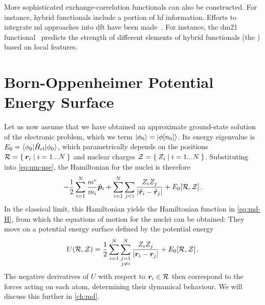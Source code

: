 More sophisticated exchange-correlation functionals can also be constructed. For instance, hybrid functionals include a portion of \gls{hf} information. Efforts to integrate \gls{ml} approaches into \gls{dft} have been made~\cite{srmb2012q,khbg2022q}.
 For instance, the \gls{dm21} functional~\cite{kmhc2021q} predicts the strength of different elements of hybrid functionals (the ) based on local features.


\section{Born-Oppenheimer Potential Energy Surface}
\label{sec:qm-bo}

Let us now assume that we have obtained an approximate ground-state solution of the electronic problem, which we term $\ket{\phi_0} = \ket{\phi[n_0]}$. Its energy eigenvalue is $E_0 = \braket{\phi_0|\hat H_{\text{el}}|\phi_0}$, which parametrically depends on the positions $\mathcal{R} = \Set{\boldsymbol{r}_i | i=1...N}$ and nuclear charges $\mathcal{Z} = \Set{Z_i | i=1...N}$. 
Substituting into \cref{eq:qm-nse}, the Hamiltonian for the nuclei is therefore
\begin{equation}
	- \frac{1}{2} \sum_{i=1}^N \frac{\mel}{m_i} \opp_i
	+ \sum_{i=1}^N \sum_{j<i} \frac{Z_i Z_j}{\magnitude{\opr_i - \opr_j}} 
	+ E_0[\Rgen,\Charges] \, . \label{eq:qm-qbopes}
\end{equation}
In the classical limit, this Hamiltonian yields the Hamiltonian function in \cref{eq:md-H}, from which the equations of motion for the nuclei can be obtained: They move on a potential energy surface defined by the potential energy
\begin{equation}
	U(\mathcal{R}, \mathcal{Z}) = \frac{1}{2} \sum_{i=1}^N \sum_{\substack{j=1 \\ j \neq i}}^N \frac{Z_i Z_j}{|\boldsymbol{r}_i - \boldsymbol{r}_j|} + E_0[\mathcal{R},\mathcal{Z}] \, .
\end{equation}
The negative derivatives of $U$ with respect to $\boldsymbol{r}_i \in \mathcal{R}$ then correspond to the forces acting on each atom, determining their dynamical behaviour. We will discuss this further in \cref{ch:md}.



